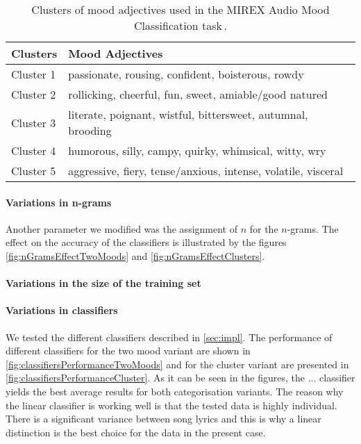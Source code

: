 \documentclass[a4paper,12pt]{article}
\begin{document}
\begin{table}
\begin{center}
\begin{tabular}{| l | l |}
\hline
\textbf{Clusters} & \textbf{Mood Adjectives} \\ \hline \hline 
Cluster 1 & passionate, rousing, confident, boisterous, rowdy \\ \hline
Cluster 2 & rollicking, cheerful, fun, sweet, amiable/good natured \\ \hline
Cluster 3 & literate, poignant, wistful, bittersweet, autumnal, brooding \\ \hline
Cluster 4 & humorous, silly, campy, quirky, whimsical, witty, wry \\ \hline
Cluster 5 & aggressive, fiery, tense/anxious, intense, volatile, visceral \\ \hline
\end{tabular}
\caption{Clusters of mood adjectives used in the MIREX Audio Mood Classification task\,\cite{downie20082007}.}
\label{tab:moodClusters}
\end{center}
\end{table}

\paragraph{Variations in n-grams} Another parameter we modified was the assignment of $n$ for the $n$-grams. The effect on the accuracy of the classifiers is illustrated by the figures \ref{fig:nGramsEffectTwoMoods} and \ref{fig:nGramsEffectClusters}.

\paragraph{Variations in the size of the training set} 

\paragraph{Variations in classifiers} We tested the different classifiers described in \ref{sec:impl}. The performance of different classifiers for the two mood variant are shown in \ref{fig:classifiersPerformanceTwoMoods} and for the cluster variant are presented in \ref{fig:classifiersPerformanceCluster}. As it can be seen in the figures, the ... classifier yields the best average results for both categorisation variants. The reason why the linear classifier is working well is that the tested data is highly individual. There is a significant variance between song lyrics and this is why a linear distinction is the best choice for the data in the present case.
\end{document}
